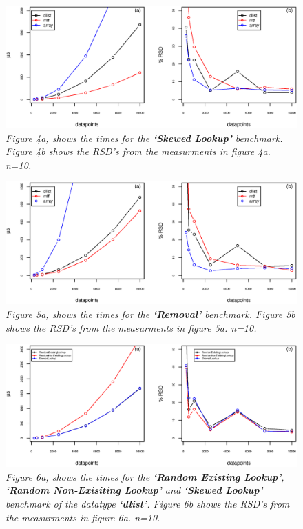 \documentclass[a4paper,11pt,twoside]{article}
\begin{document}
\begin{figure}[H] 
\centering 
\includegraphics[width=\textwidth]{figures/fig4.eps}
\caption{\textit{Figure 4a, shows the times for the \textbf{`Skewed
      Lookup'} benchmark. Figure 4b shows the RSD's from the
    measurments in figure 4a. n=10.}}
\end{figure}

\begin{figure}[H] 
\centering 
\includegraphics[width=\textwidth]{figures/fig5.eps}
\caption{\textit{Figure 5a, shows the times for the \textbf{`Removal'}
    benchmark. Figure 5b shows the RSD's from the measurments in figure 5a. n=10.}}
\end{figure}

\begin{figure}[H] 
\centering 
\includegraphics[width=\textwidth]{figures/fig6.eps}
\caption{\textit{Figure 6a, shows the times for the \textbf{`Random Existing
    Lookup'}, \textbf{`Random Non-Exisiting Lookup'} and
  \textbf{`Skewed Lookup'} benchmark of the datatype \textbf{`dlist'}. Figure 6b shows the RSD's from the measurments
in figure 6a. n=10.}}
\end{figure}
\end{document}
